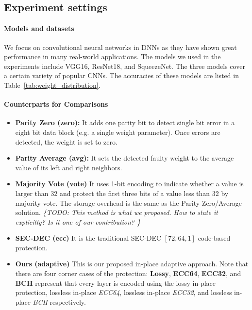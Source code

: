 \documentclass{article}
\newcommand{\TODO}[1]{{\it \color{blue}\{TODO: #1\}}}
\begin{document}
\subsection{Experiment settings}
\paragraph{Models and datasets}
We focus on convolutional neural networks in DNNs as they have shown great performance in many real-world applications. The models we used in the experiments include VGG16, ResNet18, and SqueezeNet. The three models cover a certain variety of popular CNNs. The accuracies of these models are listed in Table~\ref{tab:weight_distribution}. 

\paragraph{Counterparts for Comparisons}
\begin{itemize}
    \item \textbf{Parity Zero (zero):} It adds one parity bit to detect single bit error in a eight bit data block (e.g. a single weight parameter). Once errors are detected, the weight is set to zero. 
    \item \textbf{Parity Average (avg):} It sets the detected faulty weight to the average value of its left and right neighbors. 
    \item \textbf{Majority Vote (vote)} It uses 1-bit encoding to indicate whether a value is larger than 32 and protect the first three bits of a value less than 32 by majority vote. The storage overhead is the same as the Parity Zero/Average solution.  \TODO{This method is what we proposed. How to state it explicitly? Is it one of our contribution? }
    \item \textbf{SEC-DEC (ecc)} It is the traditional SEC-DEC $[72, 64, 1]$ code-based protection. 
    \item \textbf{Ours (adaptive)} This is our proposed in-place adaptive approach. Note that there are four corner cases of the protection: \textbf{Lossy}, \textbf{ECC64}, \textbf{ECC32}, and \textbf{BCH}  represent that every layer is encoded using the lossy in-place protection,  lossless in-place \textit{ECC64}, lossless in-place \textit{ECC32}, and lossless in-place \textit{BCH} respectively. 

\end{itemize}
\end{document}
